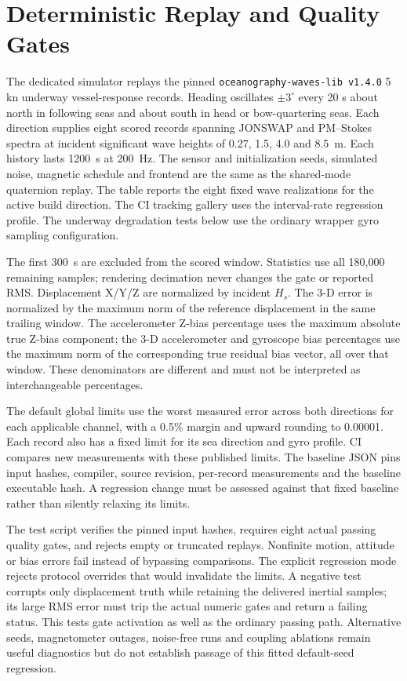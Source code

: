 \documentclass[conference]{IEEEtran}
\begin{document}
\section{Deterministic Replay and Quality Gates}
\label{sec:validation}
The dedicated simulator replays the pinned
\texttt{oceanography-waves-lib v1.4.0} 5 kn underway vessel-response records.
Heading oscillates $\pm3^\circ$ every 20 s about north in following seas
and about south in head or bow-quartering seas. Each direction supplies
eight scored records spanning JONSWAP and PM--Stokes spectra at incident
significant wave heights of 0.27, 1.5, 4.0 and 8.5~m. Each history lasts 1200~s at 200~Hz. The
sensor and initialization seeds, simulated noise, magnetic schedule and
frontend are the same as the shared-mode quaternion replay. The table reports the eight fixed wave realizations for the active build direction.
The CI tracking gallery uses the interval-rate regression profile. The underway
degradation tests below use the ordinary wrapper gyro sampling configuration.

The first 300~s are excluded from the scored window. Statistics use all
180,000 remaining samples; rendering decimation never changes the gate or
reported RMS. Displacement X/Y/Z are normalized by incident $H_s$. The 3-D
error is normalized by the maximum norm of the reference displacement in the
same trailing window. The accelerometer Z-bias percentage uses the maximum
absolute true Z-bias component; the 3-D accelerometer and gyroscope bias
percentages use the maximum norm of the corresponding true residual
bias vector, all over that window. These denominators are different and must
not be interpreted as interchangeable percentages.




The default global limits use the worst measured error across both directions
for each applicable channel, with a 0.5\% margin and upward rounding to
0.00001. Each record also has a fixed limit for its sea direction and gyro
profile. CI compares new measurements with these published limits. The baseline JSON pins input hashes, compiler,
source revision,
per-record measurements and the baseline executable hash. A regression change
must be assessed against that fixed baseline rather than silently relaxing
its limits.

The test script verifies the pinned input hashes, requires eight actual
passing quality gates, and rejects empty or truncated replays. Nonfinite
motion, attitude or bias errors fail instead of bypassing comparisons.
The explicit regression mode rejects protocol overrides that would invalidate
the limits. A negative test corrupts only displacement truth while retaining
the delivered inertial samples; its large RMS error must trip the actual
numeric gates and return a failing status. This tests gate activation as well
as the ordinary passing path. Alternative seeds, magnetometer outages,
noise-free runs and coupling ablations remain useful diagnostics but do not
establish passage of this fitted default-seed regression.
\end{document}
